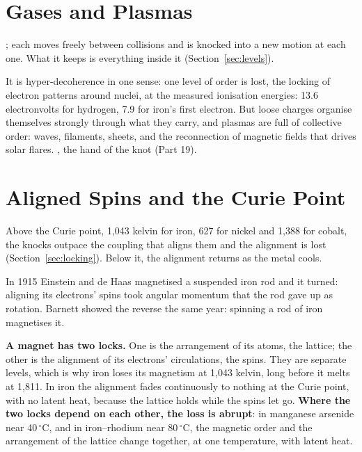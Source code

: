 \documentclass[11pt,a4paper]{article}
\begin{document}
\section{Gases and Plasmas}
\label{sec:gases}

; each moves freely between collisions and is knocked into a new motion at each one. What it keeps is everything inside it (Section~\ref{sec:levels}).

 It is hyper-decoherence in one sense: one level of order is lost, the locking of electron patterns around nuclei, at the measured ionisation energies: 13.6 electronvolts for hydrogen, 7.9 for iron's first electron. But loose charges organise themselves strongly through what they carry, and plasmas are full of collective order: waves, filaments, sheets, and the reconnection of magnetic fields that drives solar flares. , the hand of the knot (Part 19).

\section{Aligned Spins and the Curie Point}
\label{sec:curie}

 Above the Curie point, 1,043 kelvin for iron, 627 for nickel and 1,388 for cobalt, the knocks outpace the coupling that aligns them and the alignment is lost (Section~\ref{sec:locking}). Below it, the alignment returns as the metal cools.

 In 1915 Einstein and de Haas magnetised a suspended iron rod and it turned: aligning its electrons' spins took angular momentum that the rod gave up as rotation. Barnett showed the reverse the same year: spinning a rod of iron magnetises it. 

\begin{hypbar}
\textbf{A magnet has two locks.} One is the arrangement of its atoms, the lattice; the other is the alignment of its electrons' circulations, the spins. They are separate levels, which is why iron loses its magnetism at 1,043 kelvin, long before it melts at 1,811. In iron the alignment fades continuously to nothing at the Curie point, with no latent heat, because the lattice holds while the spins let go. \textbf{Where the two locks depend on each other, the loss is abrupt}: in manganese arsenide near 40\,$^\circ$C, and in iron--rhodium near 80\,$^\circ$C, the magnetic order and the arrangement of the lattice change together, at one temperature, with latent heat.\footnotemark
\end{hypbar}
\end{document}

